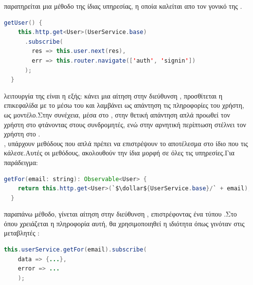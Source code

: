  παρατηρείται μια μέθοδο της ίδιας υπηρεσίας, η οποία καλείται απο τον γονικό  της .\\

	\begin{lstlisting}[language=Java]
getUser() {
    this.http.get<User>(UserService.base)
      .subscribe(
        res => this.user.next(res),
        err => this.router.navigate(['auth', 'signin'])
      );
  }
	\end{lstlisting}

 λειτουργία της είναι η εξής: κάνει μια αίτηση στην διεύθυνση , προσθίτεται η επικεφαλίδα με το  μέσω του  και λαμβάνει ως απάντηση τις πληροφορίες του χρήστη, ως  μοντέλο.Στην συνέχεια, μέσα στο , στην θετική απάντηση απλά προωθεί τον χρήστη στο  φτάνοντας στους συνδρομητές, ενώ στην αρνητική περίπτωση στέλνει τον χρήστη στο .\\
, υπάρχουν μεθόδους που απλά πρέπει να επιστρέψουν το αποτέλεσμα στο ίδιο  που τις κάλεσε.Αυτές οι μεθόδους, ακολουθούν την ίδια μορφή σε όλες τις υπηρεσίες.Για παράδειγμα:\\

	\begin{lstlisting}[language=Java]
getFor(email: string): Observable<User> {
    return this.http.get<User>(`$\dollar${UserService.base}/` + email);
  }
	\end{lstlisting}
 παραπάνω μέθοδο, γίνεται αίτηση στην διεύθυνση , επιστρέφοντας ένα  τύπου .Στο  όπου χρειάζεται η πληροφορία αυτή, θα χρησιμοποιηθεί η ιδιότητα  όπως γινόταν στις μεταβλητές :\\
	\begin{lstlisting}[language=Java]
this.userService.getFor(email).subscribe(
	data => {...},
    error => ...
  	);
	\end{lstlisting}
\pagebreak

